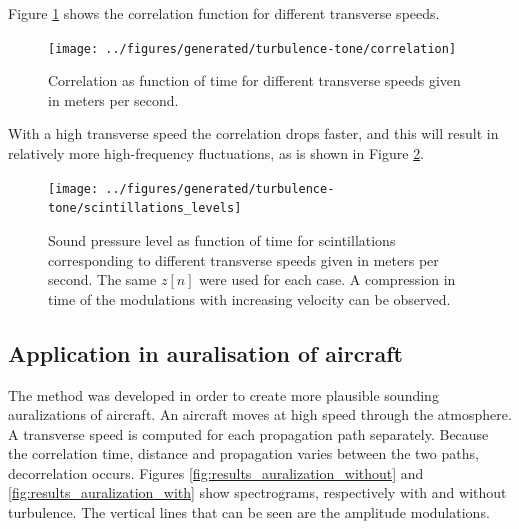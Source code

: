 Figure \ref{fig:results_scintillations_correlation} shows the correlation function for
different transverse speeds.
\begin{figure}[H]
  \centering
  \texttt{[image: ../figures/generated/turbulence-tone/correlation]}
  \caption{Correlation as function of time for different transverse speeds given in meters per second.}
  \label{fig:results_scintillations_correlation}
\end{figure}
With a high transverse speed the correlation drops
faster, and this will result in relatively more high-frequency fluctuations, as is shown in Figure \ref{fig:results_scintillations_levels}.
\begin{figure}[H]
  \centering
  \texttt{[image: ../figures/generated/turbulence-tone/scintillations\_levels]}
  \caption{Sound pressure level as function of time for scintillations
corresponding to different transverse speeds given in meters per second. The
same $z[n]$ were used for each case. A compression in time of the modulations with increasing velocity can be observed.}
  \label{fig:results_scintillations_levels}
\end{figure}


\subsection{Application in auralisation of aircraft}
The method was developed in order to create more plausible sounding
auralizations of aircraft. An aircraft moves at high speed through the
atmosphere. A transverse speed is computed for each propagation path separately.
Because the correlation time, distance and propagation varies between the two
paths, decorrelation occurs. Figures \ref{fig:results_auralization_without} and
\ref{fig:results_auralization_with} show spectrograms, respectively with and
without turbulence. The vertical lines that can be seen are the amplitude
modulations.

